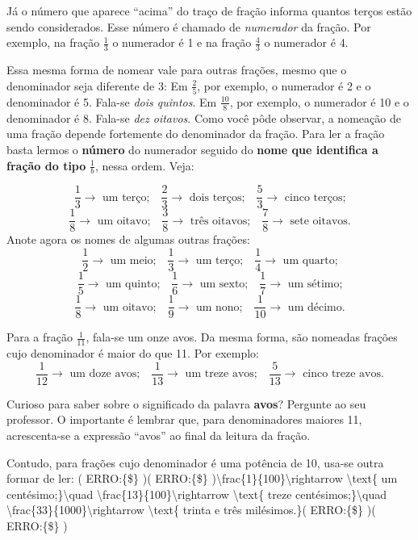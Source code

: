 \documentclass[a4,12pt]{book}
\begin{document}
Já o número que aparece ``acima'' do traço de fração informa quantos terços estão sendo considerados. Esse número é chamado de {\it numerador} da fração. Por exemplo, na fração $\frac{1}{3}$ o numerador é 1 e na fração $\frac{4}{3}$ o numerador é 4.

Essa mesma forma de nomear vale para outras frações, mesmo que o denominador seja diferente de 3:\mbox{} \newline 
Em $\frac{2}{5}$, por exemplo, o numerador é 2 e o denominador é 5. Fala-se {\it dois quintos}.\mbox{} \newline 
Em $\frac{10}{8}$, por exemplo, o numerador é 10 e o denominador é 8. Fala-se {\it dez oitavos}. \mbox{} \newline 
Como você pôde observar, a nomeação de uma fração depende fortemente do denominador da fração. Para ler a fração basta lermos o {\bf número} do numerador seguido do {\bf nome que identifica a fração do tipo} $\frac{1}{b}$, nessa ordem. Veja:

$$\frac{1}{3}\rightarrow \text{ um terço;} \quad \frac{2}{3}\rightarrow \text{ dois terços;} \quad \frac{5}{3}\rightarrow \text{ cinco terços;}$$
$$\frac{1}{8}\rightarrow \text{ um oitavo;} \quad \frac{3}{8}\rightarrow \text{ três oitavos;} \quad \frac{7}{8}\rightarrow \text{ sete oitavos.}$$
Anote agora os nomes de algumas outras frações:
$$\frac{1}{2}\rightarrow \text{  um meio;} \quad \frac{1}{3}\rightarrow\text{  um terço;} \quad \frac{1}{4}\rightarrow\text{  um quarto;}$$
$$\frac{1}{5}\rightarrow\text{  um quinto;}\quad \frac{1}{6}\rightarrow\text{  um sexto;} \quad \frac{1}{7}\rightarrow\text{  um sétimo;}$$
$$\frac{1}{8}\rightarrow\text{  um oitavo;}\quad \frac{1}{9}\rightarrow\text{  um nono;}\quad \frac{1}{10}\rightarrow\text{  um décimo.}$$

Para a fração $\frac{1}{11}$, fala-se um onze avos. Da mesma forma, são nomeadas frações cujo denominador é maior do que 11. Por exemplo:
$$\frac{1}{12}\rightarrow \text{  um doze avos;}\quad \frac{1}{13}\rightarrow \text{ um treze avos;} \quad \frac{5}{13}\rightarrow \text{ cinco treze avos.}$$

Curioso para saber sobre o significado da palavra {\bf avos}? Pergunte ao seu professor. O importante é lembrar que, para denominadores maiores 11, acrescenta-se a expressão ``avos'' ao final da leitura da fração.

Contudo, para frações cujo denominador é uma potência de 10, usa-se outra formar de ler:
( ERRO:\{\$\} )( ERRO:\{\$\} )\textbackslash{}frac\{1\}\{100\}\textbackslash{}rightarrow \textbackslash{}text\{ um centésimo;\}\textbackslash{}quad \textbackslash{}frac\{13\}\{100\}\textbackslash{}rightarrow \textbackslash{}text\{ treze centésimos;\}\textbackslash{}quad
\textbackslash{}frac\{33\}\{1000\}\textbackslash{}rightarrow \textbackslash{}text\{ trinta e três milésimos.\}( ERRO:\{\$\} )( ERRO:\{\$\} )
\end{document}
